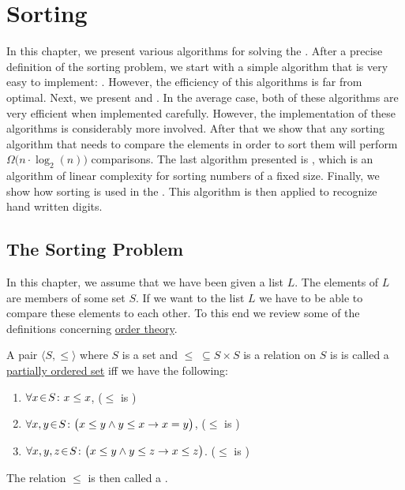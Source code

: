 \chapter{Sorting}
In this chapter, we present various algorithms for solving the .
After a precise definition of the sorting problem, we start with a simple algorithm
that is very easy to implement: .  However, the
efficiency of this algorithms is far from optimal.  Next, we present 
 and .  In the average case, both of these algorithms are very efficient when implemented carefully.
However, the implementation of these algorithms is considerably more involved.
After that we show that any sorting algorithm that needs to compare the elements in order to sort them will
perform $\Omega\bigl(n \cdot \log_2(n)\bigr)$ comparisons.  The last algorithm presented is , which is an
algorithm of linear complexity for sorting numbers of a fixed size.
Finally, we show how sorting is used in the .
This algorithm is then applied to recognize hand written digits.

\section{The Sorting Problem}
In this chapter, we assume that we have been given a list $L$.  The elements of $L$ are members of
some set $S$.  If we want to  the list $L$ we have to be able to compare these elements
to each other.  To this end we review some of the definitions concerning \href{https://en.wikipedia.org/wiki/Order_theory}{order theory}.  

\begin{Definition} 
  A pair $\langle S, \leq \rangle$ where $S$ is a set and $\leq \;\subseteq S \times S$ is a relation  on $S$ is is called a
  \href{http://en.wikipedia.org/wiki/Partially_ordered_set}{partially ordered set}  
  iff we have the following:
  \begin{enumerate}
  \item $\forall x \!\in\! S \colon x \leq x$,                      \hspace*{\fill} ($\leq$ is )
  \item $\forall x, y \!\in\! S \colon \bigl(x \leq y \wedge y \leq x
  \rightarrow x = y\bigr)$,   \hspace*{\fill} ($\leq$ is )
  \item $\forall x, y, z \!\in\! S \colon \bigl(x \leq y \wedge y \leq z \rightarrow x \leq z\bigr)$.  \hspace*{\fill} ($\leq$ is )
  \end{enumerate}
  The relation $\leq$ is then called a . \eox
\end{Definition}

